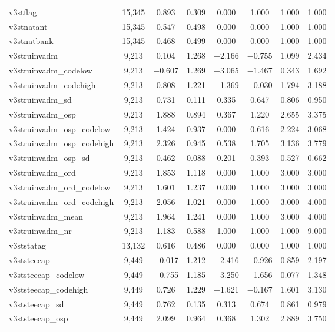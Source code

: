 \begin{table}[!htbp]
\begin{tabular}{@{\extracolsep{5pt}}lccccccc}
v3stflag & 15,345 & 0.893 & 0.309 & 0.000 & 1.000 & 1.000 & 1.000 \\ 
v3stnatant & 15,345 & 0.547 & 0.498 & 0.000 & 0.000 & 1.000 & 1.000 \\ 
v3stnatbank & 15,345 & 0.468 & 0.499 & 0.000 & 0.000 & 1.000 & 1.000 \\ 
v3struinvadm & 9,213 & 0.104 & 1.268 & $-$2.166 & $-$0.755 & 1.099 & 2.434 \\ 
v3struinvadm\_codelow & 9,213 & $-$0.607 & 1.269 & $-$3.065 & $-$1.467 & 0.343 & 1.692 \\ 
v3struinvadm\_codehigh & 9,213 & 0.808 & 1.221 & $-$1.369 & $-$0.030 & 1.794 & 3.188 \\ 
v3struinvadm\_sd & 9,213 & 0.731 & 0.111 & 0.335 & 0.647 & 0.806 & 0.950 \\ 
v3struinvadm\_osp & 9,213 & 1.888 & 0.894 & 0.367 & 1.220 & 2.655 & 3.375 \\ 
v3struinvadm\_osp\_codelow & 9,213 & 1.424 & 0.937 & 0.000 & 0.616 & 2.224 & 3.068 \\ 
v3struinvadm\_osp\_codehigh & 9,213 & 2.326 & 0.945 & 0.538 & 1.705 & 3.136 & 3.779 \\ 
v3struinvadm\_osp\_sd & 9,213 & 0.462 & 0.088 & 0.201 & 0.393 & 0.527 & 0.662 \\ 
v3struinvadm\_ord & 9,213 & 1.853 & 1.118 & 0.000 & 1.000 & 3.000 & 3.000 \\ 
v3struinvadm\_ord\_codelow & 9,213 & 1.601 & 1.237 & 0.000 & 1.000 & 3.000 & 3.000 \\ 
v3struinvadm\_ord\_codehigh & 9,213 & 2.056 & 1.021 & 0.000 & 1.000 & 3.000 & 4.000 \\ 
v3struinvadm\_mean & 9,213 & 1.964 & 1.241 & 0.000 & 1.000 & 3.000 & 4.000 \\ 
v3struinvadm\_nr & 9,213 & 1.183 & 0.588 & 1.000 & 1.000 & 1.000 & 9.000 \\ 
v3ststatag & 13,132 & 0.616 & 0.486 & 0.000 & 0.000 & 1.000 & 1.000 \\ 
v3ststeecap & 9,449 & $-$0.017 & 1.212 & $-$2.416 & $-$0.926 & 0.859 & 2.197 \\ 
v3ststeecap\_codelow & 9,449 & $-$0.755 & 1.185 & $-$3.250 & $-$1.656 & 0.077 & 1.348 \\ 
v3ststeecap\_codehigh & 9,449 & 0.726 & 1.229 & $-$1.621 & $-$0.167 & 1.601 & 3.130 \\ 
v3ststeecap\_sd & 9,449 & 0.762 & 0.135 & 0.313 & 0.674 & 0.861 & 0.979 \\ 
v3ststeecap\_osp & 9,449 & 2.099 & 0.964 & 0.368 & 1.302 & 2.889 & 3.750 \\ 

\end{tabular}
\end{table}
